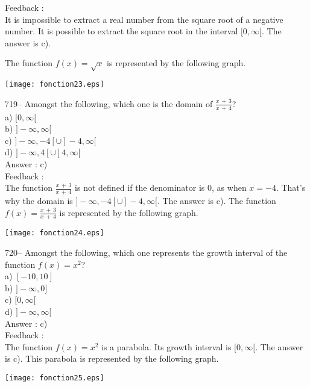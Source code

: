 \documentclass[letterpaper, 12pt]{article}
\begin{document}
Feedback : \\
It is impossible to extract a real number from the square root of a negative number. It is possible to extract the square root in the interval $[0,\infty[$.  The answer is c).  

The function $f(x)=\sqrt{x}$ is represented by the following graph.\\
    \begin{center}
    \texttt{[image: fonction23.eps]}
    \end{center}


719-- Amongst the following, which one is the domain of
$\frac{x\,+\,3}{x\,+\,4}$?\\
a) $[0,\infty[$\\
b) $]-\infty, \infty[$\\
c) $]-\infty,-4[ \cup ]-4,\infty[$\\
d) $]-\infty,4[ \cup ]4,\infty[$\\

Answer : c)\\

Feedback :\\
The function $\frac{x\,+\,3}{x\,+\,4}$ is not defined if the denominator is 0, as when $x=-4$. That's why the domain is $]-\infty,-4[ \cup ]-4,\infty[$.  
The answer is c).  
The function $f(x)=\frac{x\,+\,3}{x\,+\,4}$ is represented by the following graph.\\
    \begin{center}
    \texttt{[image: fonction24.eps]}
    \end{center}



720-- Amongst the following, which one represents the growth interval of the function $f(x)=x^{2}$?\\
a) $[-10,10]$\\
b) $]-\infty,0]$\\
c) $[0,\infty[$\\
d) $]-\infty,\infty[$\\

Answer : c)\\

Feedback : \\
The function $f(x)=x^{2}$ is a parabola. Its growth interval is $[0,\infty[$.  
The answer is c).  
This parabola is represented by the following graph.\\
    \begin{center}
    \texttt{[image: fonction25.eps]}
    \end{center}
\end{document}
